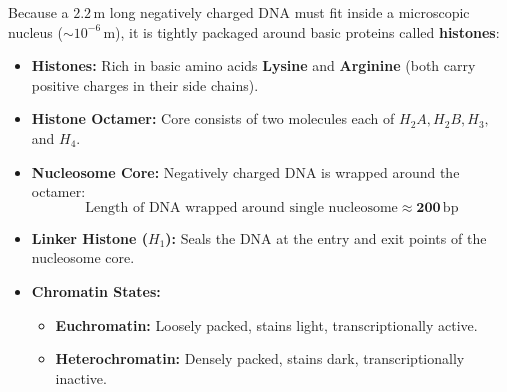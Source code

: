 \documentclass[10pt,a4paper]{article}
\begin{document}
\begin{conceptbox}
Because a $2.2\,\mathrm{m}$ long negatively charged DNA must fit inside a microscopic nucleus ($\sim 10^{-6}\,\mathrm{m}$), it is tightly packaged around basic proteins called \textbf{histones}:
\begin{itemize}
  \item \textbf{Histones:} Rich in basic amino acids \textbf{Lysine} and \textbf{Arginine} (both carry positive charges in their side chains).
  \item \textbf{Histone Octamer:} Core consists of two molecules each of $H_2A, H_2B, H_3,$ and $H_4$.
  \item \textbf{Nucleosome Core:} Negatively charged DNA is wrapped around the octamer:
  \begin{equation}
    \text{Length of DNA wrapped around single nucleosome} \approx \mathbf{200\,\mathrm{bp}}
  \end{equation}
  \item \textbf{Linker Histone ($H_1$):} Seals the DNA at the entry and exit points of the nucleosome core.
  \item \textbf{Chromatin States:}
  \begin{itemize}
    \item \textbf{Euchromatin:} Loosely packed, stains light, transcriptionally active.
    \item \textbf{Heterochromatin:} Densely packed, stains dark, transcriptionally inactive.
  \end{itemize}
\end{itemize}
\end{conceptbox}
\end{document}
